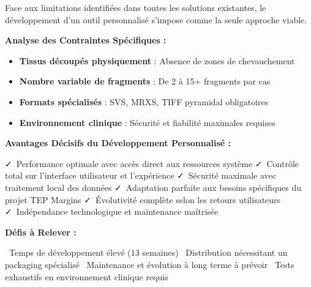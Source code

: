 \documentclass[12pt,a4paper]{report}
\newcommand{\pro}[1]{\textcolor{SuccessGreen}{\faCheck\ #1}}
\newcommand{\con}[1]{\textcolor{DangerRed}{\faTimes\ #1}}
\begin{document}
\begin{tcolorbox}[colback=SuccessGreen!10, colframe=SuccessGreen, title=Développement Personnalisé - Solution Optimale]

Face aux limitations identifiées dans toutes les solutions existantes, le développement d'un outil personnalisé s'impose comme la seule approche viable.

\vspace{0.5cm}

\textbf{Analyse des Contraintes Spécifiques :}
\begin{itemize}[leftmargin=*]
    \item \textbf{Tissus découpés physiquement} : Absence de zones de chevauchement
    \item \textbf{Nombre variable de fragments} : De 2 à 15+ fragments par cas
    \item \textbf{Formats spécialisés} : SVS, MRXS, TIFF pyramidal obligatoires
    \item \textbf{Environnement clinique} : Sécurité et fiabilité maximales requises
\end{itemize}

\vspace{0.5cm}

\textbf{Avantages Décisifs du Développement Personnalisé :}
\begin{itemize}[leftmargin=*]
    \pro{Performance optimale avec accès direct aux ressources système}
    \pro{Contrôle total sur l'interface utilisateur et l'expérience}
    \pro{Sécurité maximale avec traitement local des données}
    \pro{Adaptation parfaite aux besoins spécifiques du projet TEP Margins}
    \pro{Évolutivité complète selon les retours utilisateurs}
    \pro{Indépendance technologique et maintenance maîtrisée}
\end{itemize}

\vspace{0.5cm}

\textbf{Défis à Relever :}
\begin{itemize}[leftmargin=*]
    \con{Temps de développement élevé (13 semaines)}
    \con{Distribution nécessitant un packaging spécialisé}
    \con{Maintenance et évolution à long terme à prévoir}
    \con{Tests exhaustifs en environnement clinique requis}
\end{itemize}

\end{tcolorbox}
\end{document}
